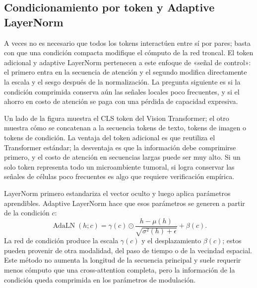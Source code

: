 \subsection{Condicionamiento por token y Adaptive LayerNorm}

A veces no es necesario que todos los tokens interactúen entre sí por pares; basta con que una condición compacta modifique el cómputo de la red troncal. El token adicional y adaptive LayerNorm pertenecen a este enfoque de «señal de control»: el primero entra en la secuencia de atención y el segundo modifica directamente la escala y el sesgo después de la normalización. La pregunta siguiente es si la condición comprimida conserva aún las señales locales poco frecuentes, y si el ahorro en costo de atención se paga con una pérdida de capacidad expresiva.


Un lado de la figura muestra el CLS token del Vision Transformer; el otro muestra cómo se concatenan a la secuencia tokens de texto, tokens de imagen o tokens de condición. La ventaja del token adicional es que reutiliza el Transformer estándar; la desventaja es que la información debe comprimirse primero, y el costo de atención en secuencias largas puede ser muy alto. Si un solo token representa todo un microambiente tumoral, si logra conservar las señales de células poco frecuentes es algo que requiere verificación empírica.


LayerNorm primero estandariza el vector oculto y luego aplica parámetros aprendibles. Adaptive LayerNorm hace que esos parámetros se generen a partir de la condición $c$:
\[
\operatorname{AdaLN}(h;c)=\gamma(c)\odot
\frac{h-\mu(h)}{\sqrt{\sigma^2(h)+\epsilon}}+\beta(c).
\]
La red de condición produce la escala $\gamma(c)$ y el desplazamiento $\beta(c)$; estos pueden provenir de otra modalidad, del paso de tiempo o de la vecindad espacial. Este método no aumenta la longitud de la secuencia principal y suele requerir menos cómputo que una cross-attention completa, pero la información de la condición queda comprimida en los parámetros de modulación.


